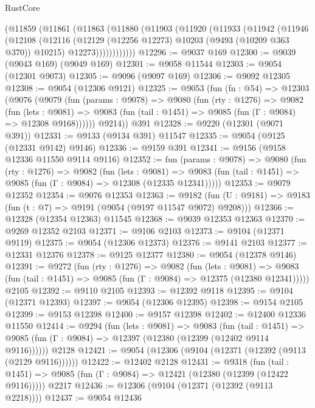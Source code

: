 \begin{lexlean}{RustCore}
\begin{coremodule}
      (@11859
        (@11861
          (@11863
            (@11880
              (@11903
                (@11920
                  (@11933
                    (@11942
                      (@11946
                        (@12108
                          (@12116
                            (@12129 (@12256 @12273) @10203 (@9493 (@10209 @363 @370)) @10215)
                            @12273))))))))))))
@12296 := @9037 @169
@12300 := @9039 (@9043 @169) (@9049 @169)
@12301 := @9058 @11544
@12303 := @9054 (@12301 @9073)
@12305 := @9096 (@9097 @169)
@12306 := @9092 @12305
@12308 := @9054 (@12306 @9121)
@12325 := @9053
    (fun (fn : @54) =>
    @12303
      (@9076
        (@9079
          (fun (params : @9078) =>
          @9080
            (fun (rty : @1276) =>
            @9082
              (fun (lets : @9081) =>
              @9083 (fun (tail : @1451) => @9085 (fun (Γ : @9084) => @12308 @9168))))))
        @9214))
    @391
@12328 := @9220 (@12301 (@9071 @391))
@12331 := @9133 (@9134 @391) @11547
@12335 := @9054 (@9125 (@12331 @9142) @9146)
@12336 := @9159 @391
@12341 := @9156 (@9158 @12336 @11550 @9114 @9116)
@12352 := fun (params : @9078) =>
  @9080
    (fun (rty : @1276) =>
    @9082
      (fun (lets : @9081) =>
      @9083 (fun (tail : @1451) => @9085 (fun (Γ : @9084) => @12308 (@12335 @12341)))))
@12353 := @9079 @12352
@12354 := @9076 @12353
@12363 := @9182
    (fun (U : @9181) => @9183 (fun (t : @7) => @9191 (@9054 (@9197 @11547 @9072) @9208)))
@12366 := @12328 (@12354 @12363) @11545
@12368 := @9039 @12353 @12363
@12370 := @9269 @12352 @2103
@12371 := @9106 @2103
@12373 := @9104 (@12371 @9119)
@12375 := @9054 (@12306 @12373)
@12376 := @9141 @2103
@12377 := @12331 @12376
@12378 := @9125 @12377
@12380 := @9054 (@12378 @9146)
@12391 := @9272
    (fun (rty : @1276) =>
    @9082
      (fun (lets : @9081) =>
      @9083 (fun (tail : @1451) => @9085 (fun (Γ : @9084) => @12375 (@12380 @12341)))))
    @2105
@12392 := @9110 @2105
@12393 := @12392 @9118
@12395 := @9104 (@12371 @12393)
@12397 := @9054 (@12306 @12395)
@12398 := @9154 @2105
@12399 := @9153 @12398
@12400 := @9157 @12398
@12402 := @12400 @12336 @11550
@12414 := @9294
    (fun (lets : @9081) =>
    @9083
      (fun (tail : @1451) =>
      @9085 (fun (Γ : @9084) => @12397 (@12380 (@12399 (@12402 @9114 @9116))))))
    @2128
@12421 := @9054 (@12306 (@9104 (@12371 (@12392 (@9113 (@2129 @9116))))))
@12422 := @12402 @2128
@12431 := @9318
    (fun (tail : @1451) => @9085 (fun (Γ : @9084) => @12421 (@12380 (@12399 (@12422 @9116)))))
    @2217
@12436 := @12306 (@9104 (@12371 (@12392 (@9113 @2218))))
@12437 := @9054 @12436

\end{coremodule}
\end{lexlean}
